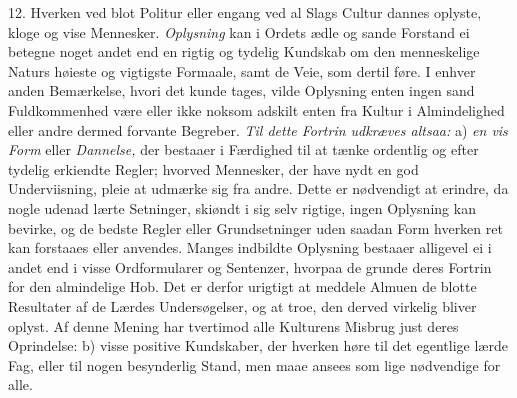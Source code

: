 \documentclass[12pt,a4paper]{article}
\newcommand{\opage}[1]{\marginnote{\footnotesize\textit{[#1]}}}
\begin{document}
12. Hverken ved blot Politur eller engang ved al Slags Cultur dannes oplyste, kloge og
vise Mennesker. \emph{Oplysning} kan i Ordets ædle og sande Forstand ei betegne noget
andet end en rigtig og tydelig Kundskab om den menneskelige Naturs høieste og vigtigste
Formaale, samt de Veie, som dertil føre. I enhver anden Bemærkelse, hvori det kunde tages,
vilde Oplysning enten ingen sand Fuldkommenhed være eller ikke noksom adskilt enten fra
Kultur i Almindelighed eller andre dermed forvante Begreber. \emph{Til dette Fortrin
udkræves altsaa:} a) \emph{en vis Form} eller \emph{Dannelse,} der bestaaer i Færdighed
til at tænke ordentlig og efter tydelig erkiendte Regler; hvorved Mennesker, der have nydt
en god Underviisning, pleie at udmærke sig fra andre. Dette er nødvendigt at erindre, da
nogle udenad lærte Setninger, skiøndt i sig selv rigtige, ingen Oplysning kan bevirke, og
de bedste Regler eller Grundsetninger uden saadan Form hverken ret kan forstaaes eller
anvendes. Manges indbildte Oplysning bestaaer alligevel ei i andet end i visse
Ordformularer og Sentenzer, hvorpaa de grunde deres Fortrin for den almindelige Hob. Det
er derfor urigtigt at meddele Almuen de blotte Resultater af de Lærdes Undersøgelser, og
at troe, den derved virkelig bliver oplyst. Af denne Mening har tvertimod alle Kulturens
Misbrug just deres
\opage{182} Oprindelse: b) visse positive Kundskaber, der hverken høre til det egentlige lærde Fag,
eller til nogen besynderlig Stand, men maae ansees som lige nødvendige for alle.
\end{document}
